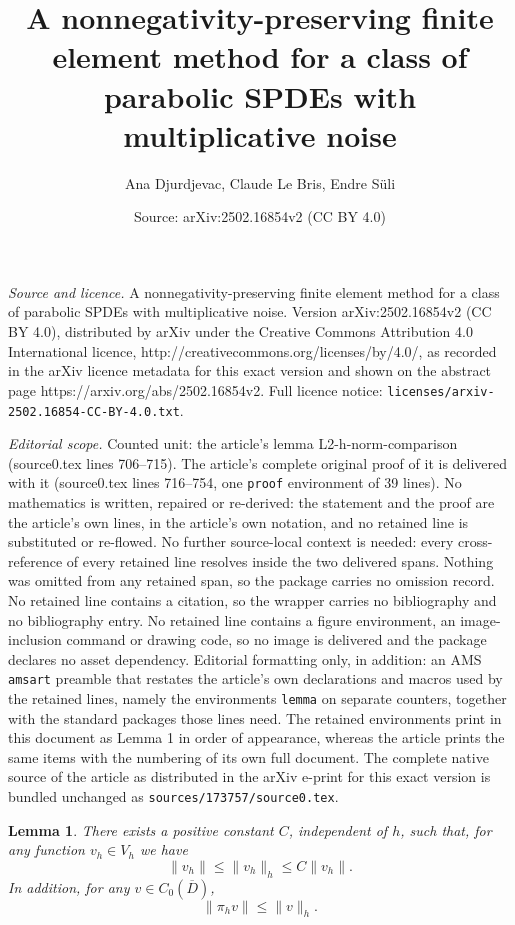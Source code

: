 \documentclass[10pt,a4paper]{amsart}
\title{A nonnegativity-preserving finite element method for a class of parabolic SPDEs with multiplicative noise}
\author{Ana Djurdjevac, Claude Le Bris, Endre S\"uli}
\date{Source: arXiv:2502.16854v2 (CC BY 4.0)}
\newtheorem{lemma}{Lemma}
\begin{document}
\maketitle

\noindent\emph{Source and licence.} A nonnegativity-preserving finite element method for a class of parabolic SPDEs with multiplicative noise. Version arXiv:2502.16854v2 (CC BY 4.0), distributed by arXiv under the Creative Commons Attribution 4.0 International licence, http://creativecommons.org/licenses/by/4.0/, as recorded in the arXiv licence metadata for this exact version and shown on the abstract page https://arxiv.org/abs/2502.16854v2. Full licence notice: \texttt{licenses/arxiv-2502.16854-CC-BY-4.0.txt}.\par\smallskip

\noindent\textit{Editorial scope.} Counted unit: the article's lemma L2-h-norm-comparison (source0.tex lines 706--715). The article's complete original proof of it is delivered with it (source0.tex lines 716--754, one \texttt{proof} environment of 39 lines). No mathematics is written, repaired or re-derived: the statement and the proof are the article's own lines, in the article's own notation, and no retained line is substituted or re-flowed.  No further source-local context is needed: every cross-reference of every retained line resolves inside the two delivered spans.  Nothing was omitted from any retained span, so the package carries no omission record.  No retained line contains a citation, so the wrapper carries no bibliography and no bibliography entry.  No retained line contains a figure environment, an image-inclusion command or drawing code, so no image is delivered and the package declares no asset dependency.  Editorial formatting only, in addition: an AMS \texttt{amsart} preamble that restates the article's own declarations and macros used by the retained lines, namely the environments \texttt{lemma} on separate counters, together with the standard packages those lines need.  The retained environments print in this document as Lemma 1 in order of appearance, whereas the article prints the same items with the numbering of its own full document.  The complete native source of the article as distributed in the arXiv e-print for this exact version is bundled unchanged as \texttt{sources/173757/source0.tex}.
\begin{lemma}\label{L2-h-norm-comparison}
There exists a positive constant $C$, independent of $h$, such that, for any function $v_h  \in V_h$ we have
     \begin{equation}\label{eq:17}
                \|v_h\|   \leq \|v_h\|_h \leq C \|v_h\|.  
    \end{equation}
In addition,  for any $v \in C_0(\overline{D})$, 
  \begin{equation}\label{eq:17bis}
  \|\pi_h v\| \leq \|v\|_h.
  \end{equation}
\end{lemma}
\end{document}
